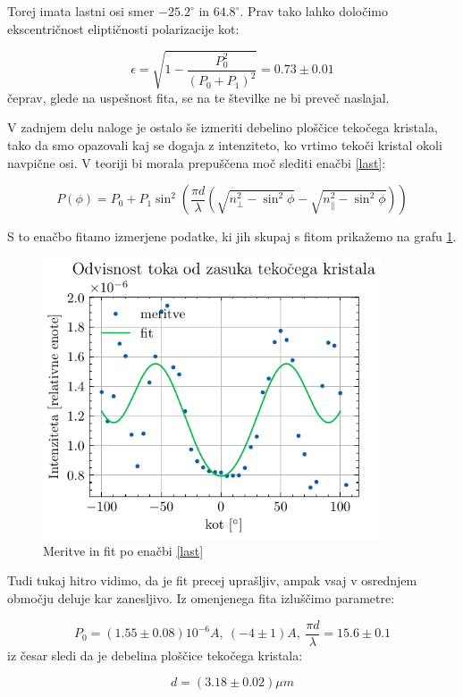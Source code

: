 \documentclass[12pt]{article}
\begin{document}
\noindent Torej imata lastni osi smer $-25.2^{\circ}$ in $64.8^{\circ}$. Prav tako lahko določimo ekscentričnost eliptičnosti polarizacije kot:

\begin{equation*}
    \epsilon = \sqrt{1-\frac{P_0^2}{(P_0 + P_1)^2}} = 0.73 \pm 0.01
\end{equation*}
čeprav, glede na uspešnost fita, se na te številke ne bi preveč naslajal.

\newpage
\noindent V zadnjem delu naloge je ostalo še izmeriti debelino ploščice tekočega kristala, tako da smo opazovali kaj se dogaja z intenziteto, ko vrtimo tekoči kristal okoli navpične osi. V teoriji bi morala prepuščena moč slediti enačbi \ref{last}:

\begin{equation}
    P(\phi) = P_0 + P_1 \sin^2\left(\frac{\pi d}{\lambda}(\sqrt{n_{\perp}^2 - \sin^2 \phi} - \sqrt{n_{\parallel}^2 - \sin^2\phi})\right)
    \label{last}
\end{equation}

S to enačbo fitamo izmerjene podatke, ki jih skupaj s fitom prikažemo na grafu \ref{balet}.

\begin{figure}[ht]
\begin{center}
    \includegraphics[width=10cm]{tk-balerina.pdf}
    \caption{Meritve in fit po enačbi \ref{last}}
    \label{balet}
\end{center}
\end{figure}
Tudi tukaj hitro vidimo, da je fit precej uprašljiv, ampak vsaj v osrednjem območju deluje kar zanesljivo. Iz omenjenega fita izluščimo parametre:

\begin{equation*}
    P_0 = (1.55\pm 0.08)10^{-6} A,\ (-4 \pm 1) A, \ \frac{\pi d}{\lambda} = 15.6\pm 0.1
\end{equation*}
iz česar sledi da je debelina ploščice tekočega kristala:

\begin{equation*}
    d = (3.18\pm 0.02) \mu m
\end{equation*}
\end{document}
